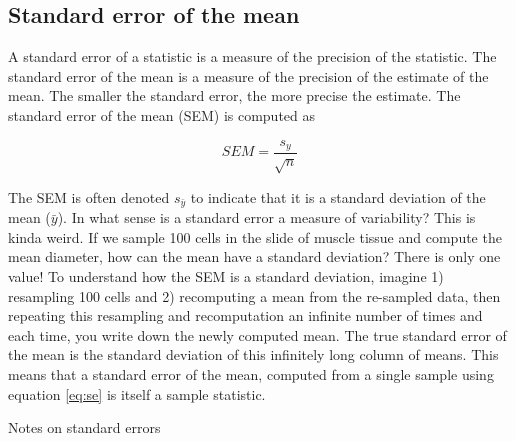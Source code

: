 \documentclass[]{book}
\begin{document}
\subsection{Standard error of the
mean}\label{standard-error-of-the-mean}

A standard error of a statistic is a measure of the precision of the
statistic. The standard error of the mean is a measure of the precision
of the estimate of the mean. The smaller the standard error, the more
precise the estimate. The standard error of the mean (SEM) is computed
as

\begin{equation}
SEM = \frac{s_y}{\sqrt{n}}
\label{eq:se}
\end{equation}

The SEM is often denoted \(s_{\bar{y}}\) to indicate that it is a
standard deviation of the mean (\(\bar{y}\)). In what sense is a
standard error a measure of variability? This is kinda weird. If we
sample 100 cells in the slide of muscle tissue and compute the mean
diameter, how can the mean have a standard deviation? There is only one
value! To understand how the SEM is a standard deviation, imagine 1)
resampling 100 cells and 2) recomputing a mean from the re-sampled data,
then repeating this resampling and recomputation an infinite number of
times and each time, you write down the newly computed mean. The true
standard error of the mean is the standard deviation of this infinitely
long column of means. This means that a standard error of the mean,
computed from a single sample using equation \eqref{eq:se} is itself a
sample statistic.

Notes on standard errors
\end{document}
